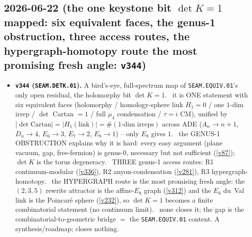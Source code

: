 \subsection*{2026-06-22 (the one keystone bit $\det K{=}1$ mapped: six equivalent faces, the genus-1 obstruction, three access routes, the hypergraph-homotopy route the most promising fresh angle: \texttt{v344})}
\begin{itemize}
\item \textbf{\texttt{v344} (\texttt{SEAM.DETK.01}).} A bird's-eye, full-spectrum map of \texttt{SEAM.EQUIV.01}'s
only open residual, the holomorphy bit $\det K{=}1$. \mE\ it is ONE statement with six equivalent faces
(holomorphy / homology-sphere link $H_1{=}0$ / one $1$-dim irrep / $\det$ Cartan $=1$ / full $\mu_4$ condensation /
$\tau{=}i$ CM), unified by $|\det\mathrm{Cartan}|=|H_1(\text{link})|=\#(\text{1-dim irreps})$ across ADE
($A_n{\to}n{+}1$, $D_n{\to}4$, $E_6{\to}3$, $E_7{\to}2$, $E_8{\to}1$) -- only $E_8$ gives $1$. \mE\ the GENUS-1
OBSTRUCTION explains why it is hard: every easy argument (plane vacuum, gap, free-fermion) is genus-0, necessary
but not sufficient (\vref{v87}); $\det K$ is the torus degeneracy. \mE\ THREE genus-1 access routes: R1
continuum-modular (\vref{v336}), R2 anyon-condensation (\vref{v281}), R3 hypergraph-homotopy. \mC\ the HYPERGRAPH
route is the most promising fresh angle: the $(2,3,5)$ rewrite attractor is the affine-$E_8$ graph (\vref{v312}) and
the $E_8$ du~Val link is the Poincar\'e sphere (\vref{v232}), so $\det K{=}1$ becomes a finite combinatorial
statement (no continuum limit). \mO\ none closes it; the gap is the combinatorial-to-geometric bridge $=$ the
\texttt{SEAM.EQUIV.01} content. A synthesis/roadmap; closes nothing.
\end{itemize}

